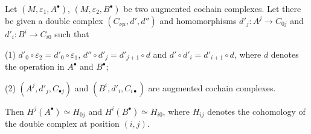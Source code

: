 Let $(M, \varepsilon_1, A^{\bullet})$, $(M, \varepsilon_2, B^{\bullet})$ be two augmented cochain complexes. Let there be given a double complex $(C_{\nu\mu}, d', d'')$ and homomorphisms $d'_j: A^j \rightarrow C_{0j}$ and $d'_i: B^i \rightarrow C_{i0}$ such that

(1) $d'_0 \circ \varepsilon_2 = d'_0 \circ \varepsilon_1$, $d'' \circ d'_j = d'_{j+1} \circ d$ and $d' \circ d'_i = d'_{i+1} \circ d$, where $d$ denotes the operation in $A^{\bullet}$ and $B^{\bullet}$;

(2) $(A^j, d'_j, C_{\bullet j})$ and $(B^i, d'_i, C_{i\bullet})$ are augmented cochain complexes.

Then $H^j(A^{\bullet}) \simeq H_{0j}$ and $H^i(B^{\bullet}) \simeq H_{i0}$, where $H_{ij}$ denotes the cohomology of the double complex at position $(i,j)$.
